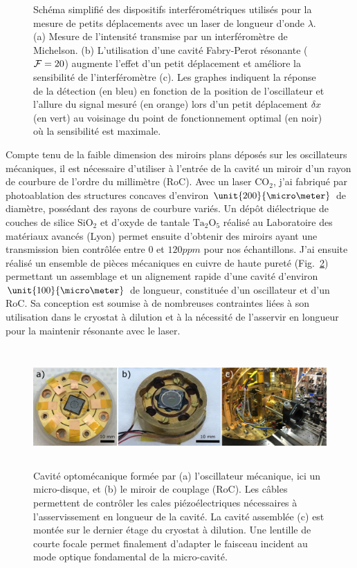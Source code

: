 \documentclass[12pt,a4paper]{article}
\newcommand{\uroc}{\micro RoC}
\begin{document}
\begin{figure}
\caption{Schéma simplifié des dispositifs interférométriques utilisés pour la mesure de petits déplacements avec un laser de longueur d'onde $\lambda$.
(a) Mesure de l'intensité transmise par un interféromètre de Michelson.
(b) L'utilisation d'une cavité Fabry-Perot résonante (${\cal{F}}=20$) augmente l'effet d'un petit déplacement et améliore la sensibilité de l'interféromètre (c).
Les graphes indiquent la réponse de la détection (en bleu) en fonction de la position de l'oscillateur et l'allure du signal mesuré (en orange) lors d'un petit déplacement $\delta x$ (en vert) au voisinage du point de fonctionnement optimal (en noir) où la sensibilité est maximale.}
\label{fig:detection_scheme}
\end{figure}

Compte tenu de la faible dimension des miroirs plans déposés sur les oscillateurs mécaniques, il est nécessaire d'utiliser à l'entrée de la cavité un miroir d'un rayon de courbure de l'ordre du millimètre (\uroc).
Avec un laser $\mathrm{CO_2}$, j'ai fabriqué par photoablation des structures concaves d'environ $\unit{200}{\micro\meter}$ de diamètre, possédant des rayons de courbure variés.
Un dépôt diélectrique de couches de silice $\mathrm{SiO_2}$ et d'oxyde de tantale $\mathrm{Ta_2O_5}$ réalisé au Laboratoire des matériaux avancés (Lyon) permet ensuite d'obtenir des miroirs ayant une transmission bien contrôlée entre 0 et $\unit{120}{ppm}$ pour nos échantillons.
J'ai ensuite réalisé un ensemble de pièces mécaniques en cuivre de haute pureté (Fig.~\ref{fig:cavity}) permettant un assemblage et un alignement rapide d'une cavité d'environ $\unit{100}{\micro\meter}$ de longueur, constituée d'un oscillateur et d'un \uroc.
Sa conception est soumise à de nombreuses contraintes liées à son utilisation dans le cryostat à dilution et à la nécessité de l'asservir en longueur pour la maintenir résonante avec le laser.

\begin{figure}
\center
\includegraphics[height=129pt]{figures/optomechanical_cavity.png}
\caption{Cavité optomécanique formée par (a) l'oscillateur mécanique, ici un micro-disque, et (b) le miroir de couplage (\uroc).
Les câbles permettent de contrôler les cales piézoélectriques nécessaires à l'asservissement en longueur de la cavité.
La cavité assemblée (c) est montée sur le dernier étage du cryostat à dilution.
Une lentille de courte focale permet finalement d'adapter le faisceau incident au mode optique fondamental de la micro-cavité.}
\label{fig:cavity}
\end{figure}
\end{document}
